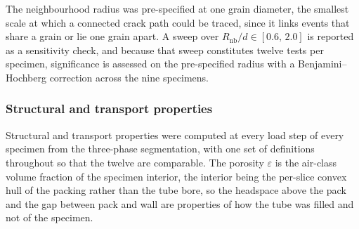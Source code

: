 \documentclass[preprint,12pt,numbers]{elsarticle}
\begin{document}
  The neighbourhood radius was pre-specified at one grain diameter, the smallest
  scale at which a connected crack path could be traced, since it links events
  that share a grain or lie one grain apart.  A sweep over
  $R_\mathrm{nb}/d \in [0.6,\,2.0]$ is reported as a sensitivity check, and
  because that sweep constitutes twelve tests per specimen, significance is
  assessed on the pre-specified radius with a Benjamini--Hochberg correction
  across the nine specimens.

  \subsubsection{Structural and transport properties}
  \label{sec:transport}
  Structural and transport properties were computed at every load step of every
  specimen from the three-phase segmentation, with one set of definitions
  throughout so that the twelve are comparable.  The porosity $\varepsilon$ is
  the air-class volume fraction of the specimen interior, the interior being the
  per-slice convex hull of the packing rather than the tube bore, so the headspace
  above the pack and the gap between pack and wall are properties of how the
  tube was filled and not of the specimen.
\end{document}

